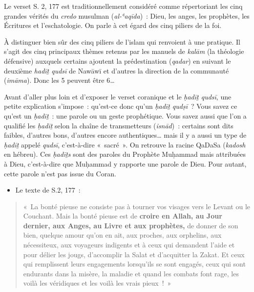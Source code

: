 
Le verset S. 2, 177 est traditionnellement considéré comme répertoriant
les cinq grandes vérités du \emph{credo} musulman (\emph{al-ʿaqīda})~:
Dieu, les anges, les prophètes, les Écritures et l'eschatologie. On
parle à cet égard des cinq piliers de la foi.

À distinguer bien sûr des cinq piliers de l'islam qui renvoient à une
pratique. Il s'agit des cinq principaux thèmes retenus par les manuels
de \emph{kalām} (la théologie défensive) auxquels certains ajoutent la
prédestination (\emph{qadar}) en suivant le deuxième \emph{hadīṯ qudsī}
de Nawāwī et d'autres la direction de la communauté (\emph{imāma}). Donc
les 5 peuvent être 6\ldots{}

Avant d'aller plus loin et d'exposer le verset coranique et le
\emph{ḥadīṯ qudsī}, une petite explication s'impose~: qu'est-ce donc
qu'un \emph{ḥadīṯ qudṣī}~? Vous savez ce qu'est un \emph{ḥadīṯ}~: une
parole ou un geste prophétique. Vous savez aussi que l'on a qualifié les
\emph{ḥadīṯ} selon la chaîne de transmetteurs (\emph{isnād})~: certains
sont dits faibles, d'autres bons, d'autres encore authentiques\ldots{}
mais il y a aussi un type de \emph{ḥadīṯ} appelé \emph{qudsī},
c'est-à-dire «~sacré~». On retrouve la racine QaDaSa (\emph{kadosh} en
hébreu). Ces \emph{ḥadīṯs} sont des paroles du Prophète Muḥammad mais
attribuées à Dieu, c'est-à-dire que Muḥammad y rapporte une parole de
Dieu. Pour autant, cette parole n'est pas issue du Coran.

\begin{itemize}
\item
  Le texte de S.2, 177~:
\end{itemize}

\begin{quote}
«~La bonté pieuse ne consiste pas à tourner vos visages vers le Levant
ou le Couchant. Mais la bonté pieuse est de \textbf{croire en Allah, au
Jour dernier, aux Anges, au Livre et aux prophètes,} de donner de son
bien, quelque amour qu'on en ait, aux proches, aux orphelins, aux
nécessiteux, aux voyageurs indigents et à ceux qui demandent l'aide et
pour délier les jougs, d'accomplir la Salat et d'acquitter la Zakat. Et
ceux qui remplissent leurs engagements lorsqu'ils se sont engagés, ceux
qui sont endurants dans la misère, la maladie et quand les combats font
rage, les voilà les véridiques et les voilà les vrais pieux~!~»
\end{quote}

